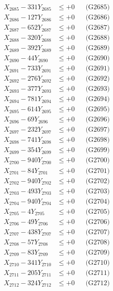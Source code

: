 \documentclass[a4paper,10pt]{article}
\begin{document}
{\begin{align}
X_{2685} - 331Y_{2685} &\leq +0 && \text{(G2685)} \\
X_{2686} - 127Y_{2686} &\leq +0 && \text{(G2686)} \\
X_{2687} - 652Y_{2687} &\leq +0 && \text{(G2687)} \\
X_{2688} - 320Y_{2688} &\leq +0 && \text{(G2688)} \\
X_{2689} - 392Y_{2689} &\leq +0 && \text{(G2689)} \\
X_{2690} - 44Y_{2690} &\leq +0 && \text{(G2690)} \\
\allowbreak
X_{2691} - 733Y_{2691} &\leq +0 && \text{(G2691)} \\
X_{2692} - 276Y_{2692} &\leq +0 && \text{(G2692)} \\
X_{2693} - 377Y_{2693} &\leq +0 && \text{(G2693)} \\
X_{2694} - 781Y_{2694} &\leq +0 && \text{(G2694)} \\
X_{2695} - 614Y_{2695} &\leq +0 && \text{(G2695)} \\
X_{2696} - 69Y_{2696} &\leq +0 && \text{(G2696)} \\
X_{2697} - 232Y_{2697} &\leq +0 && \text{(G2697)} \\
X_{2698} - 741Y_{2698} &\leq +0 && \text{(G2698)} \\
X_{2699} - 354Y_{2699} &\leq +0 && \text{(G2699)} \\
X_{2700} - 940Y_{2700} &\leq +0 && \text{(G2700)} \\
\allowbreak
X_{2701} - 84Y_{2701} &\leq +0 && \text{(G2701)} \\
X_{2702} - 940Y_{2702} &\leq +0 && \text{(G2702)} \\
X_{2703} - 493Y_{2703} &\leq +0 && \text{(G2703)} \\
X_{2704} - 940Y_{2704} &\leq +0 && \text{(G2704)} \\
X_{2705} - 4Y_{2705} &\leq +0 && \text{(G2705)} \\
X_{2706} - 49Y_{2706} &\leq +0 && \text{(G2706)} \\
X_{2707} - 438Y_{2707} &\leq +0 && \text{(G2707)} \\
X_{2708} - 57Y_{2708} &\leq +0 && \text{(G2708)} \\
X_{2709} - 83Y_{2709} &\leq +0 && \text{(G2709)} \\
X_{2710} - 341Y_{2710} &\leq +0 && \text{(G2710)} \\
\allowbreak
X_{2711} - 205Y_{2711} &\leq +0 && \text{(G2711)} \\
X_{2712} - 324Y_{2712} &\leq +0 && \text{(G2712)} \\

\end{align}}
\end{document}
